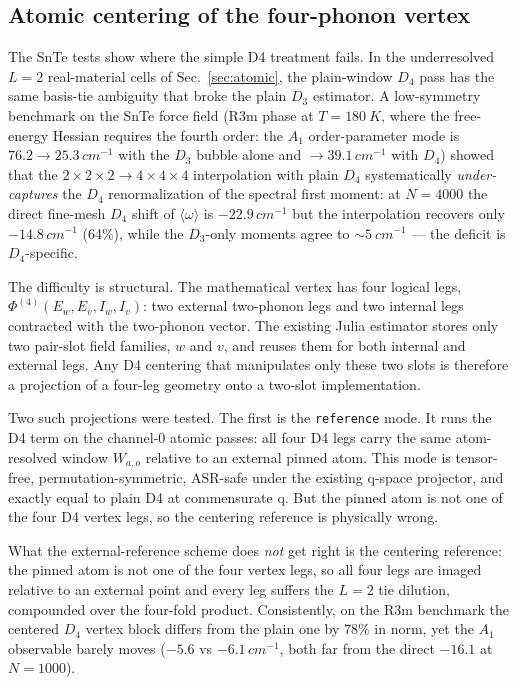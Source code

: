\documentclass[11pt,a4paper]{article}
\begin{document}
\subsection{Atomic centering of the four-phonon vertex}
\label{sec:d4center}

The SnTe tests show where the simple D4 treatment fails.  In the
underresolved $L=2$ real-material cells of Sec.~\ref{sec:atomic}, the
plain-window $D_4$ pass has the same basis-tie ambiguity that broke the
plain $D_3$ estimator.  A low-symmetry benchmark on the SnTe force field
(R3m phase at
$T=\SI{180}{K}$, where the free-energy Hessian requires the fourth order:
the $A_1$ order-parameter mode is $76.2 \to 25.3\,\si{cm^{-1}}$ with the
$D_3$ bubble alone and $\to 39.1\,\si{cm^{-1}}$ with $D_4$) showed that the
$2{\times}2{\times}2 \to 4{\times}4{\times}4$ interpolation with plain
$D_4$ systematically \emph{under-captures} the $D_4$ renormalization of
the spectral first moment: at $N=4000$ the direct fine-mesh $D_4$ shift of
$\langle\omega\rangle$ is $-22.9\,\si{cm^{-1}}$ but the interpolation
recovers only $-14.8\,\si{cm^{-1}}$ (64\%), while the $D_3$-only moments
agree to $\sim\SI{5}{cm^{-1}}$ --- the deficit is $D_4$-specific.

The difficulty is structural.  The mathematical vertex has four logical
legs, $\Phi^{(4)}(E_w,E_v,I_w,I_v)$: two external two-phonon legs and two
internal legs contracted with the two-phonon vector.  The existing Julia
estimator stores only two pair-slot field families, $w$ and $v$, and reuses
them for both internal and external legs.  Any D4 centering that manipulates
only these two slots is therefore a projection of a four-leg geometry onto a
two-slot implementation.

Two such projections were tested.  The first is the \texttt{reference} mode.
It runs the D4 term on the channel-0 atomic passes: all four D4 legs carry
the same atom-resolved window $W_{a,o}$ relative to an external pinned atom.
This mode is tensor-free, permutation-symmetric, ASR-safe under the existing
q-space projector, and exactly equal to plain D4 at commensurate q.  But the
pinned atom is not one of the four D4 vertex legs, so the centering reference
is physically wrong.

What the external-reference scheme does \emph{not} get right is the
centering reference: the pinned atom is not one of the four vertex legs, so
all four legs are imaged relative to an external point and every leg
suffers the $L{=}2$ tie dilution, compounded over the four-fold product.
Consistently, on the R3m benchmark the centered $D_4$ vertex block differs
from the plain one by 78\% in norm, yet the $A_1$ observable barely moves
($-5.6$ vs $-6.1\,\si{cm^{-1}}$, both far from the direct $-16.1$ at
$N=1000$).
\end{document}
